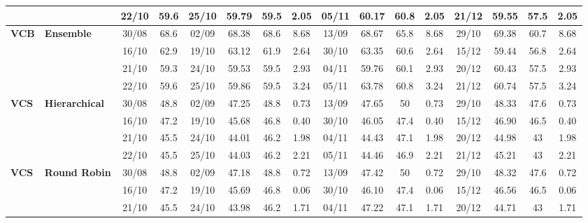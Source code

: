 \documentclass{ieeeaccess}
\begin{document}
\begin{table}[!h]
\begin{tabular}{llcc|cccc|cccc|cccc}
&
& 22/10 & 59.6 & 25/10 & 59.79 & 59.5 & 2.05 & 05/11 & 60.17 & 60.8 & 2.05 & 21/12 & 59.55 & 57.5 & 2.05 \\
\midrule

\multirow{4}{*}{\textbf{VCB}} 
& \textbf{Ensemble}
& 30/08 & 68.6 & 02/09 & 68.38 & 68.6 & 8.68 & 13/09 & 68.67 & 65.8 & 8.68 & 29/10 & 69.38 & 60.7 & 8.68 \\

&
& 16/10 & 62.9 & 19/10 & 63.12 & 61.9 & 2.64 & 30/10 & 63.35 & 60.6 & 2.64 & 15/12 & 59.44 & 56.8 & 2.64 \\

&
& 21/10 & 59.3 & 24/10 & 59.53 & 59.5 & 2.93 & 04/11 & 59.76 & 60.1 & 2.93 & 20/12 & 60.43 & 57.5 & 2.93 \\

&
& 22/10 & 59.6 & 25/10 & 59.86 & 59.5 & 3.24 & 05/11 & 63.78 & 60.8 & 3.24 & 21/12 & 60.74 & 57.5 & 3.24 \\
\midrule



\multirow{4}{*}{\textbf{VCS}} 
& \textbf{Hierarchical}
& 30/08 & 48.8 & 02/09 & 47.25 & 48.8 & 0.73 & 13/09 & 47.65 & 50 & 0.73 & 29/10 & 48.33 & 47.6 & 0.73 \\

&
& 16/10 & 47.2 & 19/10 & 45.68 & 46.8 & 0.40 & 30/10 & 46.05 & 47.4 & 0.40 & 15/12 & 46.90 & 46.5 & 0.40 \\

&
& 21/10 & 45.5 & 24/10 & 44.01 & 46.2 & 1.98 & 04/11 & 44.43 & 47.1 & 1.98 & 20/12 & 44.98 & 43 & 1.98 \\

&
& 22/10 & 45.5 & 25/10 & 44.03 & 46.2 & 2.21 & 05/11 & 44.46 & 46.9 & 2.21 & 21/12 & 45.21 & 43 & 2.21 \\
\midrule


\multirow{4}{*}{\textbf{VCS}} 
& \textbf{Round Robin}
& 30/08 & 48.8 & 02/09 & 47.18 & 48.8 & 0.72 & 13/09 & 47.42 & 50 & 0.72 & 29/10 & 48.32 & 47.6 & 0.72 \\

&
& 16/10 & 47.2 & 19/10 & 45.69 & 46.8 & 0.06 & 30/10 & 46.10 & 47.4 & 0.06 & 15/12 & 46.56 & 46.5 & 0.06 \\

&
& 21/10 & 45.5 & 24/10 & 43.98 & 46.2 & 1.71 & 04/11 & 47.22 & 47.1 & 1.71 & 20/12 & 44.71 & 43 & 1.71 \\


\end{tabular}
\end{table}
\end{document}
